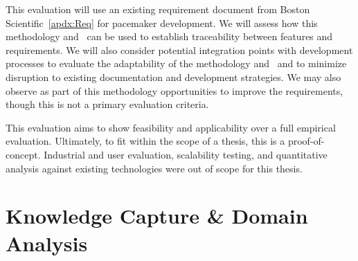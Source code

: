 This evaluation will use an existing requirement document from Boston Scientific~\ref{apdx:Req} for pacemaker development. We will assess how this methodology and \tool\ can be used to establish traceability between features and requirements. We will also consider potential integration points with development processes to evaluate the adaptability of the methodology and \tool\ and to minimize disruption to existing documentation and development strategies. We may also observe as part of this methodology opportunities to improve the requirements, though this is not a primary evaluation criteria.

This evaluation aims to show feasibility and applicability over a full empirical evaluation. Ultimately, to fit within the scope of a thesis, this is a proof-of-concept. Industrial and user evaluation, scalability testing, and quantitative analysis against existing technologies were out of scope for this thesis.



\section{Knowledge Capture \& Domain Analysis}

